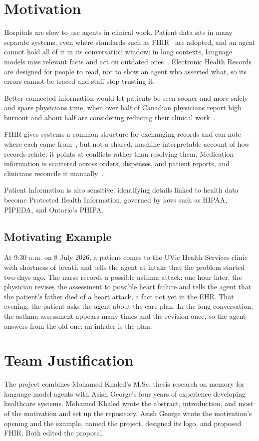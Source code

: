 \documentclass[sigconf]{acmart}
\begin{document}
\section{Motivation}
Hospitals are slow to use agents in clinical work. Patient data sits in many separate systems, even where standards such as FHIR~\cite{fhir} are adopted, and an agent cannot hold all of it in its conversation window: in long contexts, language models miss relevant facts and act on outdated ones~\cite{memoryagentbench}. Electronic Health Records are designed for people to read, not to show an agent who asserted what, so its errors cannot be traced and staff stop trusting it.

Better-connected information would let patients be seen sooner and more safely and spare physicians time, when over half of Canadian physicians report high burnout and about half are considering reducing their clinical work~\cite{cma2022}.

FHIR gives systems a common structure for exchanging records and can note where each came from~\cite{provenance}, but not a shared, machine-interpretable account of how records relate; it points at conflicts rather than resolving them. Medication information is scattered across orders, dispenses, and patient reports, and clinicians reconcile it manually~\cite{fhirmeds}.

Patient information is also sensitive: identifying details linked to health data become Protected Health Information, governed by laws such as HIPAA, PIPEDA, and Ontario's PHIPA.


\subsection{Motivating Example}
At 9:30 a.m. on 8 July 2026, a patient comes to the UVic Health Services clinic with shortness of breath and tells the agent at intake that the problem started two days ago. The nurse records a possible asthma attack; one hour later, the physician revises the assessment to possible heart failure and tells the agent that the patient's father died of a heart attack, a fact not yet in the EHR. That evening, the patient asks the agent about the care plan. In the long conversation, the asthma assessment appears many times and the revision once, so the agent answers from the old one: an inhaler is the plan.

\section{Team Justification}
The project combines Mohamed Khaled's M.Sc. thesis research on memory for language model agents with Asish George's four years of experience developing healthcare systems. Mohamed Khaled wrote the abstract, introduction, and most of the motivation and set up the repository. Asish George wrote the motivation's opening and the example, named the project, designed its logo, and proposed FHIR. Both edited the proposal.
\end{document}
